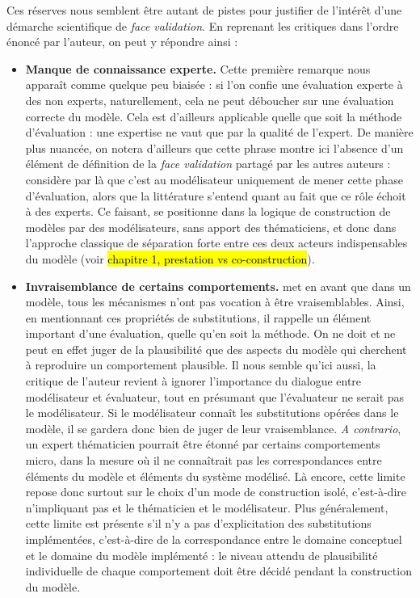Ces réserves nous semblent être autant de pistes pour justifier de l'intérêt d'une démarche scientifique de \textit{face validation}. En reprenant les critiques dans l'ordre énoncé par l'auteur, on peut y répondre ainsi :
\begin{itemize}
	\item \textbf{Manque de connaissance experte.}
	Cette première remarque nous apparaît comme quelque peu biaisée : si l'on confie une évaluation experte à des non experts, naturellement, cela ne peut déboucher sur une évaluation correcte du modèle.
	Cela est d'ailleurs applicable quelle que soit la méthode d'évaluation : une expertise ne vaut que par la qualité de l'expert.
	De manière plus nuancée, on notera d'ailleurs que cette phrase montre ici l'absence d'un élément de définition de la \textit{face validation} partagé par les autres auteurs :
	\citeauthor{hermann_validation_1967} considère par là que c'est au modélisateur uniquement de mener cette phase d'évaluation, alors que la littérature s'entend quant au fait que ce rôle échoit à des experts.
	Ce faisant, \citeauthor{hermann_validation_1967} se positionne dans la logique de construction de modèles par des modélisateurs, sans apport des thématiciens, et donc dans l'approche classique de séparation forte entre ces deux acteurs indispensables du modèle (voir \hl{chapitre 1, prestation vs co-construction}).
	
	\item \textbf{Invraisemblance de certains comportements.}
	\citeauthor{hermann_validation_1967} met en avant que dans un modèle, tous les mécanismes n'ont pas vocation à être vraisemblables.
	Ainsi, en mentionnant ces \og propriétés de substitutions\fg{}, il rappelle un élément important d'une évaluation, quelle qu'en soit la méthode.
	On ne doit et ne peut en effet juger de la plausibilité que des aspects du modèle qui cherchent à reproduire un comportement plausible.
	Il nous semble qu'ici aussi, la critique de l'auteur revient à ignorer l'importance du dialogue entre modélisateur et évaluateur, tout en présumant que l'évaluateur ne serait pas le modélisateur.
	Si le modélisateur connaît les \og substitutions\fg{} opérées dans le modèle, il se gardera donc bien de juger de leur vraisemblance.
	\textit{A contrario}, un expert thématicien pourrait être étonné par certains comportements micro, dans la mesure où il ne connaîtrait pas les correspondances entre éléments du modèle et éléments du système modélisé.
	Là encore, cette limite repose donc surtout sur le choix d'un mode de construction isolé, c'est-à-dire n'impliquant pas et le thématicien et le modélisateur.
	Plus généralement, cette limite est présente s'il n'y a pas d'explicitation des \og substitutions\fg{} implémentées, c'est-à-dire de la correspondance entre le domaine conceptuel et le domaine du modèle implémenté : le niveau attendu de plausibilité individuelle de chaque comportement doit être décidé pendant la construction du modèle.
	

\end{itemize}
